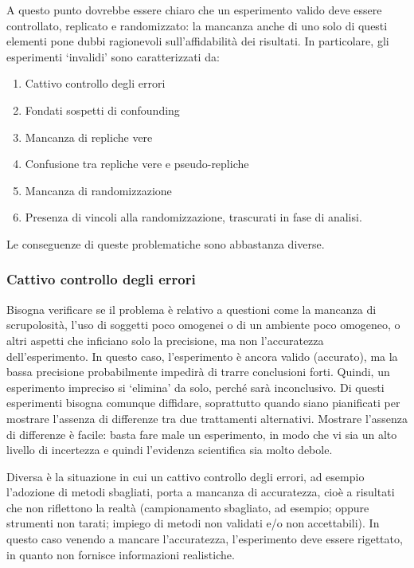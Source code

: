 \documentclass[a4paper,12pt,oneside]{book}
\providecommand{\tightlist}{%
  \setlength{\itemsep}{0pt}\setlength{\parskip}{0pt}}
\begin{document}
A questo punto dovrebbe essere chiaro che un esperimento valido deve essere controllato, replicato e randomizzato: la mancanza anche di uno solo di questi elementi pone dubbi ragionevoli sull'affidabilità dei risultati. In particolare, gli esperimenti `invalidi' sono caratterizzati da:

\begin{enumerate}
\def\labelenumi{\arabic{enumi}.}
\tightlist
\item
  Cattivo controllo degli errori
\item
  Fondati sospetti di confounding
\item
  Mancanza di repliche vere
\item
  Confusione tra repliche vere e pseudo-repliche
\item
  Mancanza di randomizzazione
\item
  Presenza di vincoli alla randomizzazione, trascurati in fase di analisi.
\end{enumerate}

Le conseguenze di queste problematiche sono abbastanza diverse.

\hypertarget{cattivo-controllo-degli-errori}{%
\subsubsection{Cattivo controllo degli errori}\label{cattivo-controllo-degli-errori}}

Bisogna verificare se il problema è relativo a questioni come la mancanza di scrupolosità, l'uso di soggetti poco omogenei o di un ambiente poco omogeneo, o altri aspetti che inficiano solo la precisione, ma non l'accuratezza dell'esperimento. In questo caso, l'esperimento è ancora valido (accurato), ma la bassa precisione probabilmente impedirà di trarre conclusioni forti. Quindi, un esperimento impreciso si `elimina' da solo, perché sarà inconclusivo. Di questi esperimenti bisogna comunque diffidare, soprattutto quando siano pianificati per mostrare l'assenza di differenze tra due trattamenti alternativi. Mostrare l'assenza di differenze è facile: basta fare male un esperimento, in modo che vi sia un alto livello di incertezza e quindi l'evidenza scientifica sia molto debole.

Diversa è la situazione in cui un cattivo controllo degli errori, ad esempio l'adozione di metodi sbagliati, porta a mancanza di accuratezza, cioè a risultati che non riflettono la realtà (campionamento sbagliato, ad esempio; oppure strumenti non tarati; impiego di metodi non validati e/o non accettabili). In questo caso venendo a mancare l'accuratezza, l'esperimento deve essere rigettato, in quanto non fornisce informazioni realistiche.
\end{document}
